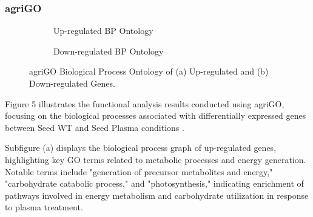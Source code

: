 \documentclass[12pt,letterpaper]{article}
\begin{document}
\subsubsection{agriGO}
\begin{figure}[H]
\begin{subfigure}[b]{1\textwidth}
    \centering
    \caption{Up-regulated BP Ontology}
    \label{fig:enter-label}
\end{subfigure}\par
\begin{subfigure}[b]{1\textwidth}
    \centering
    \caption{Down-regulated BP Ontology}
    \label{fig:enter-label}
\end{subfigure}
\caption{agriGO Biological Process Ontology of (a) Up-regulated and (b) Down-regulated Genes.}
\end{figure}

Figure 5 illustrates the functional analysis results conducted using agriGO, focusing on the biological processes associated with differentially expressed genes between Seed WT and Seed Plasma conditions \parencite{tian2017agrigo}.

Subfigure (a) displays the biological process graph of up-regulated genes, highlighting key GO terms related to metabolic processes and energy generation. Notable terms include "generation of precursor metabolites and energy," "carbohydrate catabolic process," and "photosynthesis," indicating enrichment of pathways involved in energy metabolism and carbohydrate utilization in response to plasma treatment.
\end{document}
